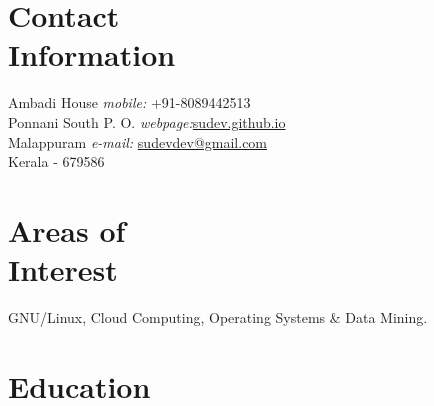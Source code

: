 \documentclass[margin,line]{resume}
\begin{document}
\begin{resume}

    \section{\mysidestyle Contact\\Information}
    
        
    Ambadi House   \hfill \textit{mobile:} \hspace{9mm} 		+91-8089442513 \\ 
    Ponnani South P. O.	\hfill \textit{webpage:}\hspace{14mm}\href{http://sudev.github.io}{sudev.github.io}\\
    Malappuram \hfill 	\textit{e-mail:} \hspace{3.6mm}\href{mailto:sudevdev@gmail.com}{sudevdev@gmail.com}     \\
    Kerala - 679586
			
        \vspace{-2.5mm}
        
        \vspace{3mm}
%
					
    \section{\mysidestyle Areas of\\Interest}

   GNU/Linux, Cloud Computing, Operating Systems \&  Data Mining.
\vspace{3mm}


    \section{\mysidestyle Education}


\end{resume}
\end{document}
